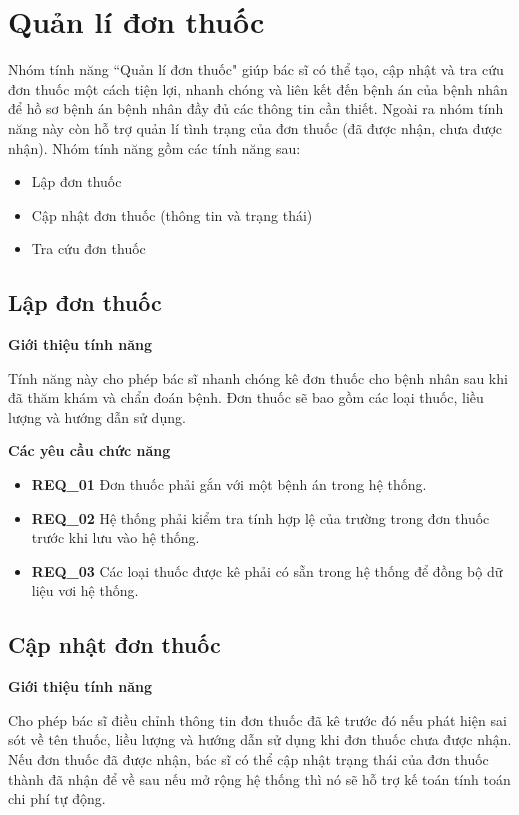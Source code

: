 \section{Quản lí đơn thuốc}

Nhóm tính năng ``Quản lí đơn thuốc" giúp bác sĩ có thể tạo, cập nhật và tra cứu đơn thuốc một cách tiện lợi, nhanh chóng và liên kết đến bệnh án của bệnh nhân để hồ sơ bệnh án bệnh nhân đầy đủ các thông tin cần thiết. Ngoài ra nhóm tính năng này còn hỗ trợ quản lí tình trạng của đơn thuốc (đã được nhận, chưa được nhận). Nhóm tính năng gồm các tính năng sau:
\begin{itemize}
  \item Lập đơn thuốc
  \item Cập nhật đơn thuốc (thông tin và trạng thái)
  \item Tra cứu đơn thuốc
\end{itemize}

\subsection{Lập đơn thuốc}

\noindent \textbf{Giới thiệu tính năng}

Tính năng này cho phép bác sĩ nhanh chóng kê đơn thuốc cho bệnh nhân sau khi đã thăm khám và chẩn đoán bệnh. Đơn thuốc sẽ bao gồm các loại thuốc, liều lượng và hướng dẫn sử dụng.

\noindent \textbf{Các yêu cầu chức năng}
\begin{itemize}
  \item \textbf{REQ\_01} Đơn thuốc phải gắn với một bệnh án trong hệ thống.
  \item \textbf{REQ\_02} Hệ thống phải kiểm tra tính hợp lệ của trường trong đơn thuốc trước khi lưu vào hệ thống.
  \item \textbf{REQ\_03} Các loại thuốc được kê phải có sẵn trong hệ thống để đồng bộ dữ liệu vơi hệ thống.
\end{itemize}

\subsection{Cập nhật đơn thuốc}

\noindent \textbf{Giới thiệu tính năng}

Cho phép bác sĩ điều chỉnh thông tin đơn thuốc đã kê trước đó nếu phát hiện sai sót về tên thuốc, liều lượng và hướng dẫn sử dụng khi đơn thuốc chưa được nhận. Nếu đơn thuốc đã được nhận, bác sĩ có thể cập nhật trạng thái của đơn thuốc thành đã nhận để về sau nếu mở rộng hệ thống thì nó sẽ hỗ trợ kế toán tính toán chi phí tự động.


